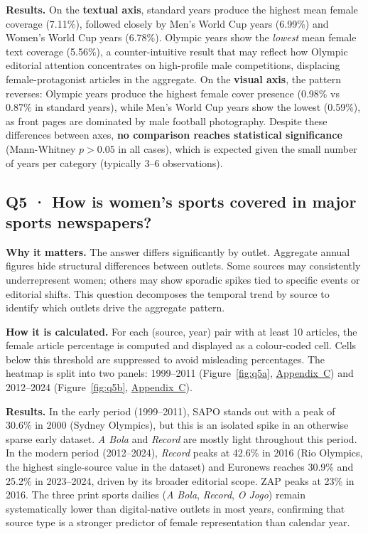 \documentclass[11pt,a4paper]{article}
\begin{document}
\textbf{Results.} On the \textbf{textual axis}, standard years produce the highest mean female coverage (7.11\%), followed closely by Men's World Cup years (6.99\%) and Women's World Cup years (6.78\%). Olympic years show the \textit{lowest} mean female text coverage (5.56\%), a counter-intuitive result that may reflect how Olympic editorial attention concentrates on high-profile male competitions, displacing female-protagonist articles in the aggregate. On the \textbf{visual axis}, the pattern reverses: Olympic years produce the highest female cover presence (0.98\% vs 0.87\% in standard years), while Men's World Cup years show the lowest (0.59\%), as front pages are dominated by male football photography. Despite these differences between axes, \textbf{no comparison reaches statistical significance} (Mann-Whitney $p > 0.05$ in all cases), which is expected given the small number of years per category (typically 3--6 observations).


\subsection[Q5 · Women's sports coverage by newspaper]{Q5 · How is women's sports covered in major sports newspapers?}

\textbf{Why it matters.} The answer differs significantly by outlet. Aggregate annual figures hide structural differences between outlets. Some sources may consistently underrepresent women; others may show sporadic spikes tied to specific events or editorial shifts. This question decomposes the temporal trend by source to identify which outlets drive the aggregate pattern.

\textbf{How it is calculated.} For each (source, year) pair with at least 10 articles, the female article percentage is computed and displayed as a colour-coded cell. Cells below this threshold are suppressed to avoid misleading percentages. The heatmap is split into two panels: 1999--2011 (Figure~\ref{fig:q5a}, \hyperref[app:figures]{Appendix~C}) and 2012--2024 (Figure~\ref{fig:q5b}, \hyperref[app:figures]{Appendix~C}).

\textbf{Results.} In the early period (1999--2011), SAPO stands out with a peak of 30.6\% in 2000 (Sydney Olympics), but this is an isolated spike in an otherwise sparse early dataset. \textit{A Bola} and \textit{Record} are mostly light throughout this period. In the modern period (2012--2024), \textit{Record} peaks at 42.6\% in 2016 (Rio Olympics, the highest single-source value in the dataset) and Euronews reaches 30.9\% and 25.2\% in 2023--2024, driven by its broader editorial scope. ZAP peaks at 23\% in 2016. The three print sports dailies (\textit{A Bola}, \textit{Record}, \textit{O Jogo}) remain systematically lower than digital-native outlets in most years, confirming that source type is a stronger predictor of female representation than calendar year.
\end{document}
